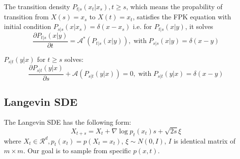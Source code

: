 \begin{theorem}
     The transition density $P_{t|s}(x_t|x_s),t\geq s$, which means the propability of transition from $X(s)=x_s$ to $X(t)=x_t$, satisfies the FPK equation with initial condition $P_{s|s}(x|x_s)=\delta(x-x_s)$
     i.e. for $P_{t|s}(x|y)$, it solves
     \begin{equation}
        \frac{\partial P_{t|s}(x|y)}{\partial t}=\mathcal{A}^*(P_{t|s}(x|y)), \operatorname{with} P_{s|s}(x|y)=\delta(x-y)
     \end{equation}
\end{theorem}

\begin{theorem}
    $P_{s|t}(y|x)$ for $t\geq s$ solves:
    \begin{equation}
        \frac{\partial P_{s|t}(y|x)}{\partial s} + \mathcal{A}(P_{s|t}(y|x))=0, \operatorname{ with }P_{s|t}(y|x) = \delta(x-y)
    \end{equation}
\end{theorem}
\subsection{Langevin SDE}
The Langevin SDE has the following form:
\begin{equation}
    X_{t + s} = X_t + \nabla \log p_t(x_t)s + \sqrt{2s}\xi
\end{equation}
where $X_t\in \mathcal{R}^d, p_t(x_t)=p(X_t=x_t)$, $\xi\sim N(0, I)$, $I$ is identical matrix of $m \times m$. Our goal is to sample from specific $p(x, t)$.

